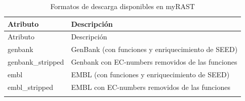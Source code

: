\documentclass[12pt,twoside]{reedthesis}
\begin{document}
  \begin{longtable}[]{@{}ll@{}}
  \caption{Formatos de descarga disponibles en myRAST
  \label{tab:myrast}}\tabularnewline
  \toprule
  \begin{minipage}[b]{0.22\columnwidth}\raggedright\strut
  Atributo\strut
  \end{minipage} & \begin{minipage}[b]{0.72\columnwidth}\raggedright\strut
  Descripción\strut
  \end{minipage}\tabularnewline
  \midrule
  \endfirsthead
  \toprule
  \begin{minipage}[b]{0.22\columnwidth}\raggedright\strut
  Atributo\strut
  \end{minipage} & \begin{minipage}[b]{0.72\columnwidth}\raggedright\strut
  Descripción\strut
  \end{minipage}\tabularnewline
  \midrule
  \endhead
  \begin{minipage}[t]{0.22\columnwidth}\raggedright\strut
  genbank\strut
  \end{minipage} & \begin{minipage}[t]{0.72\columnwidth}\raggedright\strut
  GenBank (con funciones y enriquecimiento de SEED)\strut
  \end{minipage}\tabularnewline
  \begin{minipage}[t]{0.22\columnwidth}\raggedright\strut
  genbank\_stripped\strut
  \end{minipage} & \begin{minipage}[t]{0.72\columnwidth}\raggedright\strut
  Genbank con EC-numbers removidos de las funciones\strut
  \end{minipage}\tabularnewline
  \begin{minipage}[t]{0.22\columnwidth}\raggedright\strut
  embl\strut
  \end{minipage} & \begin{minipage}[t]{0.72\columnwidth}\raggedright\strut
  EMBL (con funciones y enriquecimiento de SEED)\strut
  \end{minipage}\tabularnewline
  \begin{minipage}[t]{0.22\columnwidth}\raggedright\strut
  embl\_stripped\strut
  \end{minipage} & \begin{minipage}[t]{0.72\columnwidth}\raggedright\strut
  EMBL con EC-numbers removidos de las funciones\strut
  \end{minipage}\tabularnewline
  \begin{minipage}[t]{0.22\columnwidth}\raggedright\strut

\end{minipage}
\end{longtable}
\end{document}
